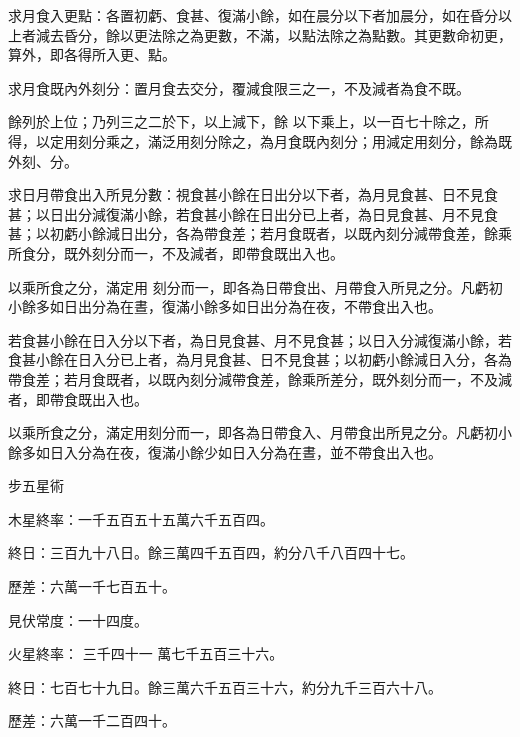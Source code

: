 \begin{pinyinscope}
 求月食入更點：各置初虧、食甚、復滿小餘，如在晨分以下者加晨分，如在昏分以上者減去昏分，餘以更法除之為更數，不滿，以點法除之為點數。其更數命初更，算外，即各得所入更、點。



 求月食既內外刻分：置月食去交分，覆減食限三之一，不及減者為食不既。



 餘列於上位；乃列三之二於下，以上減下，餘
 以下乘上，以一百七十除之，所得，以定用刻分乘之，滿泛用刻分除之，為月食既內刻分；用減定用刻分，餘為既外刻、分。



 求日月帶食出入所見分數：視食甚小餘在日出分以下者，為月見食甚、日不見食甚；以日出分減復滿小餘，若食甚小餘在日出分已上者，為日見食甚、月不見食甚；以初虧小餘減日出分，各為帶食差；若月食既者，以既內刻分減帶食差，餘乘所食分，既外刻分而一，不及減者，即帶食既出入也。



 以乘所食之分，滿定用
 刻分而一，即各為日帶食出、月帶食入所見之分。凡虧初小餘多如日出分為在晝，復滿小餘多如日出分為在夜，不帶食出入也。



 若食甚小餘在日入分以下者，為日見食甚、月不見食甚；以日入分減復滿小餘，若食甚小餘在日入分已上者，為月見食甚、日不見食甚；以初虧小餘減日入分，各為帶食差；若月食既者，以既內刻分減帶食差，餘乘所差分，既外刻分而一，不及減者，即帶食既出入也。



 以乘所食之分，滿定用刻分而一，即各為日帶食入、月帶食出所見之分。凡虧初小餘多如日入分為在夜，復滿小餘少如日入分為在晝，並不帶食出入也。



 步五星術



 木星終率：一千五百五十五萬六千五百四。



 終日：三百九十八日。餘三萬四千五百四，約分八千八百四十七。



 歷差：六萬一千七百五十。



 見伏常度：一十四度。



 火星終率：
 三千四十一
 萬七千五百三十六。



 終日：七百七十九日。餘三萬六千五百三十六，約分九千三百六十八。



 歷差：六萬一千二百四十。




\end{pinyinscope}
